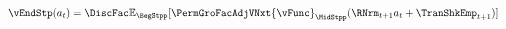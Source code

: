   \begin{equation}\begin{gathered}\begin{aligned}
        \vEndStp(a_{\stp})  & = \DiscFac \Ex_{\BegStpp}[\PermGroFacAdjVNxt{\vFunc}_{\MidStpp}(\RNrm_{\stp+1} a_{\stp}+{\TranShkEmp}_{\stp+1})]  \label{eq:vEndtdefn}
      \end{aligned}\end{gathered}\end{equation}
